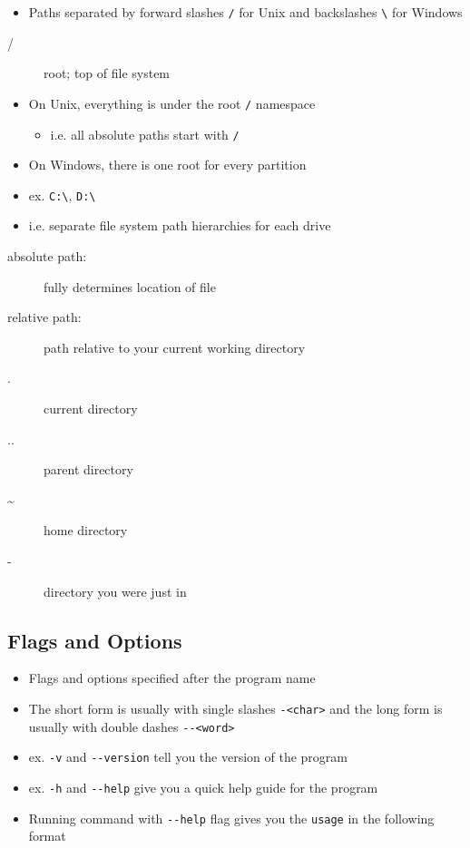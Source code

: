 \documentclass[letterpaper,12pt]{article}
\begin{document}
\begin{itemize}
 \item Paths separated by forward slashes \lstinline{/} for Unix and backslashes \lstinline{\} for Windows
\end{itemize}

\begin{description}
 \item[/] root; top of file system
\end{description}

\begin{itemize}
 \item On Unix, everything is under the root \lstinline{/} namespace
       \begin{itemize}
        \item i.e. all absolute paths start with \lstinline{/}
       \end{itemize}
 \item On Windows, there is one root for every partition
 \item ex. \lstinline{C:\}, \lstinline{D:\}
 \item i.e. separate file system path hierarchies for each drive
\end{itemize}

\begin{description}
 \item[absolute path:] fully determines location of file
 \item[relative path:] path relative to your current working directory
 \item[.] current directory
 \item[..] parent directory
 \item[\textasciitilde] home directory
 \item[-] directory you were just in
\end{description}

\subsection{Flags and Options}

\begin{itemize}
 \item Flags and options specified after the program name
 \item The short form is usually with single slashes \lstinline{-<char>} and the long form is usually with double dashes \lstinline{--<word>}
 \item ex. \lstinline{-v} and \lstinline{--version} tell you the version of the program
 \item ex. \lstinline{-h} and \lstinline{--help} give you a quick help guide for the program
 \item Running command with \lstinline{--help} flag gives you the \lstinline{usage} in the following format
\end{itemize}
\end{document}
